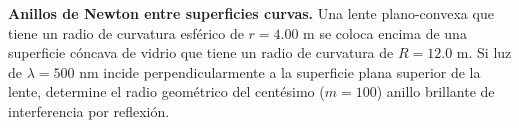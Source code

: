 \item \textbf{Anillos de Newton entre superficies curvas.}
Una lente plano-convexa que tiene un radio de curvatura esférico de $r = 4.00\text{ m}$ se coloca encima de una superficie cóncava de vidrio que tiene un radio de curvatura de $R = 12.0\text{ m}$. Si luz de $\lambda = 500\text{ nm}$ incide perpendicularmente a la superficie plana superior de la lente, determine el radio geométrico del centésimo ($m = 100$) anillo brillante de interferencia por reflexión.